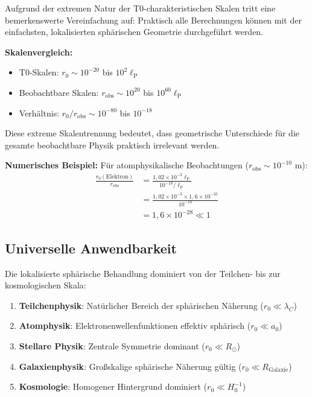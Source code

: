 \documentclass[12pt,a4paper]{report}
\newcommand{\lP}{\ell_{\text{P}}}         %
\newcommand{\rzero}{r_0}                  %
\begin{document}
	Aufgrund der extremen Natur der T0-charakteristischen Skalen tritt eine bemerkenswerte Vereinfachung auf: Praktisch alle Berechnungen können mit der einfachsten, lokalisierten sphärischen Geometrie durchgeführt werden.
	
	\textbf{Skalenvergleich:}
	\begin{itemize}
		\item T0-Skalen: $\rzero \sim 10^{-20}$ bis $10^{2} \lP$
		\item Beobachtbare Skalen: $r_{\text{obs}} \sim 10^{20}$ bis $10^{60} \lP$
		\item Verhältnis: $\rzero/r_{\text{obs}} \sim 10^{-80}$ bis $10^{-18}$
	\end{itemize}
	
	Diese extreme Skalentrennung bedeutet, dass geometrische Unterschiede für die gesamte beobachtbare Physik praktisch irrelevant werden.
	
	\textbf{Numerisches Beispiel:}
	Für atomphysikalische Beobachtungen ($r_{\text{obs}} \sim 10^{-10}$ m):
	\begin{align}
		\frac{\rzero(\text{Elektron})}{r_{\text{obs}}} &= \frac{1,02 \times 10^{-3} \lP}{10^{-10}/\lP} \\
		&= \frac{1,02 \times 10^{-3} \times 1,6 \times 10^{-35}}{10^{-10}} \\
		&= 1,6 \times 10^{-28} \ll 1
	\end{align}
	
	\subsection{Universelle Anwendbarkeit}
	\label{subsec:universal_applicability}
	
	Die lokalisierte sphärische Behandlung dominiert von der Teilchen- bis zur kosmologischen Skala:
	\begin{enumerate}
		\item \textbf{Teilchenphysik}: Natürlicher Bereich der sphärischen Näherung ($\rzero \ll \lambda_C$)
		\item \textbf{Atomphysik}: Elektronenwellenfunktionen effektiv sphärisch ($\rzero \ll a_0$)
		\item \textbf{Stellare Physik}: Zentrale Symmetrie dominant ($\rzero \ll R_{\odot}$)
		\item \textbf{Galaxienphysik}: Großskalige sphärische Näherung gültig ($\rzero \ll R_{\text{Galaxie}}$)
		\item \textbf{Kosmologie}: Homogener Hintergrund dominiert ($\rzero \ll H_0^{-1}$)
	\end{enumerate}
	
\end{document}
